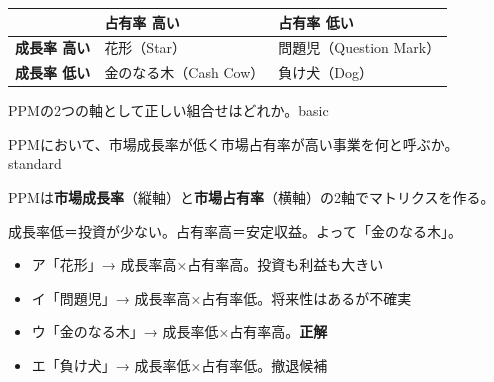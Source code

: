 \begin{center}
\begin{tabularx}{\textwidth}{lXX}
  \toprule
  & \textbf{占有率 高い} & \textbf{占有率 低い} \\
  \midrule
  \textbf{成長率 高い} & 花形（Star） & 問題児（Question Mark） \\
  \textbf{成長率 低い} & 金のなる木（Cash Cow） & 負け犬（Dog） \\
  \bottomrule
\end{tabularx}
\end{center}


\begin{mondai}{PPMの2つの軸として正しい組合せはどれか。}{basic}
\end{mondai}

\begin{mondai}{PPMにおいて、市場成長率が低く市場占有率が高い事業を何と呼ぶか。}{standard}
\end{mondai}

\kaitoupage

\begin{kaisetsu}
PPMは\textbf{市場成長率}（縦軸）と\textbf{市場占有率}（横軸）の2軸でマトリクスを作る。
\end{kaisetsu}

\begin{kaisetsu}
成長率低＝投資が少ない。占有率高＝安定収益。よって「金のなる木」。
\end{kaisetsu}
\begin{goutoubun}
\begin{itemize}
  \item ア「花形」→ 成長率高×占有率高。投資も利益も大きい
  \item イ「問題児」→ 成長率高×占有率低。将来性はあるが不確実
  \item ウ「金のなる木」→ 成長率低×占有率高。\textbf{正解}
  \item エ「負け犬」→ 成長率低×占有率低。撤退候補
\end{itemize}
\end{goutoubun}


